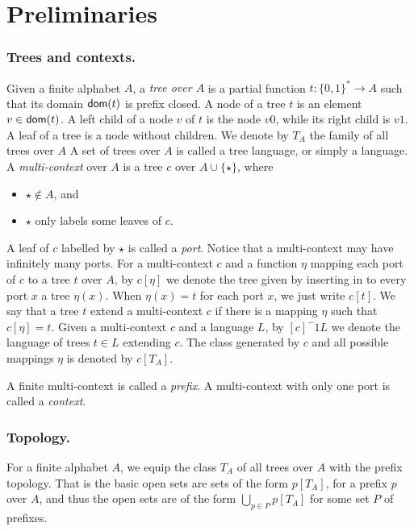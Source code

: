 
\section{Preliminaries}
\subsubsection*{Trees and contexts.}
Given a finite alphabet $A$, a \emph{tree over $A$} is a partial function $t: \{0,1\}^* \to A$ such that its domain $\mathsf{dom}(t)$ is prefix closed. A node of a tree $t$ is an element $v \in \mathsf{dom}(t)$. A left child of a node $v$ of $t$ is the node $v0$, while its right child is $v1$. A leaf of a tree is a node without children. %
We denote by $T_A$ the family of all  trees over $A$
A set of trees over $A$ is called a tree language, or simply a language.
A \emph{multi-context} over $A$ is a tree $c$ over $A \cup \{\star\}$, where 
\begin{itemize} 
\item $\star \notin A$, and 
\item $\star$ only labels some leaves of $c$. 
\end{itemize}
A leaf of $c$ labelled by $\star$ is called a \emph{port}. Notice that a multi-context may have infinitely many ports. For a multi-context $c$ and a function $\eta$ mapping each port of $c$ to a tree $t$ over $A$, by $c[\eta]$ we denote the tree given by inserting in to every port $x$ a tree $\eta(x)$. When $\eta(x)=t$ for each port $x$, we just write $c[t]$.  We say that a tree $t$ extend a multi-context $c$ if there is a mapping $\eta$ such that $c[\eta]=t$. Given a multi-context $c$ and a language $L$, by $[c]^-1L$ we denote the language of trees $t\in L$ extending $c$.
 The class generated by $c$ and all possible mappings $\eta$ is denoted by $c[T_A]$.%

A finite multi-context is called a \emph{prefix}.
A multi-context with only one port is called a \emph{context}. %




\subsubsection*{Topology.}
For a finite alphabet $A$, we equip the class $T_A$ of all trees over $A$ with the prefix topology. That is the basic open sets are sets of the form $p[T_A]$, for a prefix $p$ over $A$, and thus the open sets are of the form $\bigcup_{p \in P}p[T_A]$ for some set $P$ of prefixes. 

